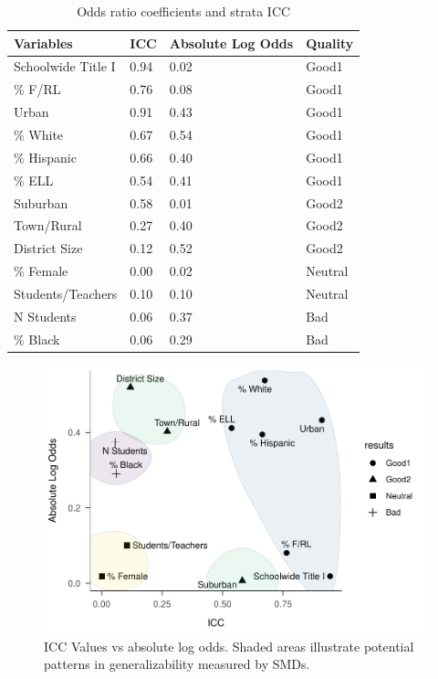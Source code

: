 \documentclass[man,floatsintext]{apa6}
\begin{document}
\begin{table}[tbp]
\begin{center}
\begin{threeparttable}
\caption{\label{tab:tab-ICC-Pars}Odds ratio coefficients and strata ICC}
\begin{tabular}{llll}
\toprule
Variables & ICC & Absolute Log Odds & Quality\\
\midrule
Schoolwide Title I & 0.94 & 0.02 & Good1\\
\% F/RL & 0.76 & 0.08 & Good1\\
Urban & 0.91 & 0.43 & Good1\\
\% White & 0.67 & 0.54 & Good1\\
\% Hispanic & 0.66 & 0.40 & Good1\\
\% ELL & 0.54 & 0.41 & Good1\\
Suburban & 0.58 & 0.01 & Good2\\
Town/Rural & 0.27 & 0.40 & Good2\\
District Size & 0.12 & 0.52 & Good2\\
\% Female & 0.00 & 0.02 & Neutral\\
Students/Teachers & 0.10 & 0.10 & Neutral\\
N Students & 0.06 & 0.37 & Bad\\
\% Black & 0.06 & 0.29 & Bad\\
\bottomrule
\end{tabular}
\end{threeparttable}
\end{center}
\end{table}



\begin{figure}
\centering
\includegraphics{GenSamp_Paper_files/figure-latex/fig-ICCvsCoef-1.pdf}
\caption{\label{fig:fig-ICCvsCoef}ICC Values vs absolute log odds. Shaded areas illustrate potential patterns in generalizability measured by SMDs.}
\end{figure}
\end{document}
